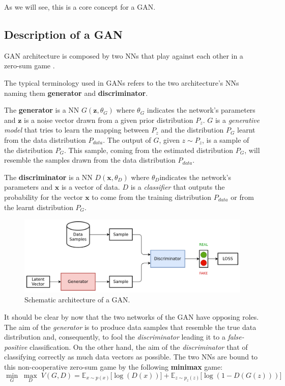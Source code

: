As we will see, this is a core concept for a GAN.


\subsection{Description of a GAN}
GAN architecture is composed by two NNs that play against each other in a zero-sum game \cite{gan_2014}.

The typical terminology used in GANs refers to the two architecture's NNs naming them \textbf{generator} and \textbf{discriminator}.

The \textbf{generator} is a NN $G(\textbf{z}, \theta_G)$ where $\theta_G$ indicates the network's parameters and $\textbf{z}$ is a noise vector drawn from a given prior distribution $P_z$.
$G$ is a \textit{generative model} that tries to learn the mapping between $P_z$ and the distribution $P_G$ learnt from the data distribution $P_{data}$.
The output of $G$, given $z \sim P_z$, is a sample of the distribution $P_G$.
This sample, coming from the estimated distribution $P_G$, will resemble the samples drawn from the data distribution $P_{data}$.

The \textbf{discriminator} is a NN $D(\textbf{x}, \theta_D)$ where $\theta_D$indicates the network's parameters and $\textbf{x}$ is a vector of data.
$D$ is a \textit{classifier} that outputs the probability for the vector $\textbf{x}$ to come from the training distribution $P_{data}$ or from the learnt distribution $P_G$.

\begin{figure}[H]
	\centering
	\includegraphics[width=12cm, keepaspectratio]{img/2_2_gan_arch.png}
	\caption{Schematic architecture of a GAN.}
\end{figure}

It should be clear by now that the two networks of the GAN have opposing roles.
The aim of the \textit{generator} is to produce data samples that resemble the true data distribution and, consequently, to fool the \textit{discriminator} leading it to a \textit{false-positive} classification.
On the other hand, the aim of the \textit{discriminator} that of classifying correctly as much data vectors as possible.
The two NNs are bound to this non-cooperative zero-sum game by the following \textbf{minimax} game:
$$ \underset{G}{\min} \; \underset{D}{\max} \; V(G,D) = \mathbb{E}_{x\sim p(x)}\big[\log(D(x))\big] + \mathbb{E}_{z\sim p_{z}(z)}\big[\log(1-D(G(z)))\big] $$

